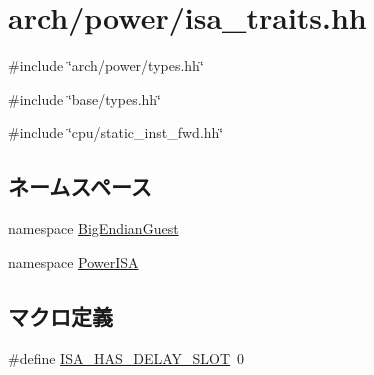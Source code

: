 \hypertarget{power_2isa__traits_8hh}{
\section{arch/power/isa\_\-traits.hh}
\label{power_2isa__traits_8hh}
}
{\ttfamily \#include \char`\"{}arch/power/types.hh\char`\"{}}\par
{\ttfamily \#include \char`\"{}base/types.hh\char`\"{}}\par
{\ttfamily \#include \char`\"{}cpu/static\_\-inst\_\-fwd.hh\char`\"{}}\par
\subsection*{ネームスペース}
\begin{DoxyCompactItemize}
\item 
namespace \hyperlink{namespaceBigEndianGuest}{BigEndianGuest}
\item 
namespace \hyperlink{namespacePowerISA}{PowerISA}
\end{DoxyCompactItemize}
\subsection*{マクロ定義}
\begin{DoxyCompactItemize}
\item 
\#define \hyperlink{power_2isa__traits_8hh_aae21ac6833454e7ead9810c372658afc}{ISA\_\-HAS\_\-DELAY\_\-SLOT}~0
\end{DoxyCompactItemize}
